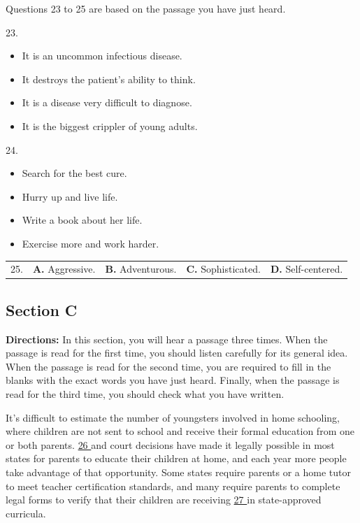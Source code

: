 \documentclass[UTF8,11pt]{ctexart}
\begin{document}
Questions 23 to 25 are based on the passage you have just heard.


23.


\begin{itemize}[leftmargin=2em,itemsep=.2em,topsep=.4em]\item[A.] It is an uncommon infectious disease.
\item[B.] It destroys the patient’s ability to think.
\item[C.] It is a disease very difficult to diagnose.
\item[D.] It is the biggest crippler of young adults.
\end{itemize}

24.


\begin{itemize}[leftmargin=2em,itemsep=.2em,topsep=.4em]\item[A.] Search for the best cure.
\item[B.] Hurry up and live life.
\item[C.] Write a book about her life.
\item[D.] Exercise more and work harder.
\end{itemize}

\noindent\begin{tabularx}{\linewidth}{@{}lXXXX@{}}25. & \textbf{A.} Aggressive. & \textbf{B.} Adventurous. & \textbf{C.} Sophisticated. & \textbf{D.} Self-centered.\\\end{tabularx}\par

\subsection*{Section C}


\textbf{Directions:} In this section, you will hear a passage three times. When the passage is read for the first time, you should listen carefully for its general idea. When the passage is read for the second time, you are required to fill in the blanks with the exact words you have just heard. Finally, when the passage is read for the third time, you should check what you have written.


It’s difficult to estimate the number of youngsters involved in home schooling, where children are not sent to school and receive their formal education from one or both parents. \uline{26 }and court decisions have made it legally possible in most states for parents to educate their children at home, and each year more people take advantage of that opportunity. Some states require parents or a home tutor to meet teacher certification standards, and many require parents to complete legal forms to verify that their children are receiving \uline{27 }in state-approved curricula.
\end{document}
